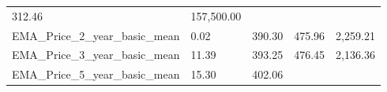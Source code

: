 \documentclass[]{article}
\begin{document}
\begin{longtable}[]{@{}lllll@{}}
\begin{minipage}[t]{0.09\columnwidth}
312.46\strut
\end{minipage} & \begin{minipage}[t]{0.11\columnwidth}\raggedright\strut
157,500.00\strut
\end{minipage}\tabularnewline
\begin{minipage}[t]{0.49\columnwidth}\raggedright\strut
EMA\_Price\_2\_year\_basic\_mean\strut
\end{minipage} & \begin{minipage}[t]{0.08\columnwidth}\raggedright\strut
0.02\strut
\end{minipage} & \begin{minipage}[t]{0.09\columnwidth}\raggedright\strut
390.30\strut
\end{minipage} & \begin{minipage}[t]{0.09\columnwidth}\raggedright\strut
475.96\strut
\end{minipage} & \begin{minipage}[t]{0.11\columnwidth}\raggedright\strut
2,259.21\strut
\end{minipage}\tabularnewline
\begin{minipage}[t]{0.49\columnwidth}\raggedright\strut
EMA\_Price\_3\_year\_basic\_mean\strut
\end{minipage} & \begin{minipage}[t]{0.08\columnwidth}\raggedright\strut
11.39\strut
\end{minipage} & \begin{minipage}[t]{0.09\columnwidth}\raggedright\strut
393.25\strut
\end{minipage} & \begin{minipage}[t]{0.09\columnwidth}\raggedright\strut
476.45\strut
\end{minipage} & \begin{minipage}[t]{0.11\columnwidth}\raggedright\strut
2,136.36\strut
\end{minipage}\tabularnewline
\begin{minipage}[t]{0.49\columnwidth}\raggedright\strut
EMA\_Price\_5\_year\_basic\_mean\strut
\end{minipage} & \begin{minipage}[t]{0.08\columnwidth}\raggedright\strut
15.30\strut
\end{minipage} & \begin{minipage}[t]{0.09\columnwidth}\raggedright\strut
402.06\strut
\end{minipage} & \begin{minipage}[t]{0.09\columnwidth}\raggedright\strut

\end{minipage}
\end{longtable}
\end{document}
